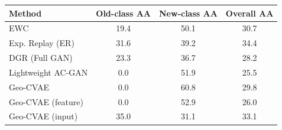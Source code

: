 \begin{tabular}{lccc}
\toprule
\textbf{Method} & \textbf{Old-class AA} & \textbf{New-class AA} & \textbf{Overall AA} \\
\midrule
EWC & 19.4 & 50.1 & 30.7 \\
Exp. Replay (ER) & 31.6 & 39.2 & 34.4 \\
DGR (Full GAN) & 23.3 & 36.7 & 28.2 \\
Lightweight AC-GAN & 0.0 & 51.9 & 25.5 \\
Geo-CVAE & 0.0 & 60.8 & 29.8 \\
Geo-CVAE (feature) & 0.0 & 52.9 & 26.0 \\
Geo-CVAE (input) & 35.0 & 31.1 & 33.1 \\
\bottomrule
\end{tabular}